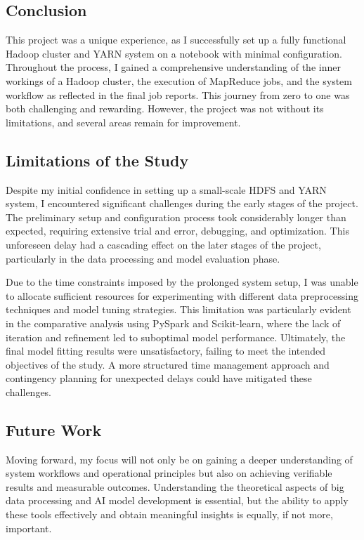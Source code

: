 \documentclass[12pt,a4paper]{article}
\begin{document}
\begin{multicols}{2}
\section{Conclusion}

This project was a unique experience, as I successfully set up a fully functional Hadoop cluster and YARN system on a notebook with minimal configuration. Throughout the process, I gained a comprehensive understanding of the inner workings of a Hadoop cluster, the execution of MapReduce jobs, and the system workflow as reflected in the final job reports. This journey from zero to one was both challenging and rewarding. However, the project was not without its limitations, and several areas remain for improvement.

\subsection{Limitations of the Study}

Despite my initial confidence in setting up a small-scale HDFS and YARN system, I encountered significant challenges during the early stages of the project. The preliminary setup and configuration process took considerably longer than expected, requiring extensive trial and error, debugging, and optimization. This unforeseen delay had a cascading effect on the later stages of the project, particularly in the data processing and model evaluation phase.

Due to the time constraints imposed by the prolonged system setup, I was unable to allocate sufficient resources for experimenting with different data preprocessing techniques and model tuning strategies. This limitation was particularly evident in the comparative analysis using PySpark and Scikit-learn, where the lack of iteration and refinement led to suboptimal model performance. Ultimately, the final model fitting results were unsatisfactory, failing to meet the intended objectives of the study. A more structured time management approach and contingency planning for unexpected delays could have mitigated these challenges.

\subsection{Future Work}

Moving forward, my focus will not only be on gaining a deeper understanding of system workflows and operational principles but also on achieving verifiable results and measurable outcomes. Understanding the theoretical aspects of big data processing and AI model development is essential, but the ability to apply these tools effectively and obtain meaningful insights is equally, if not more, important. 


\end{multicols}
\end{document}
